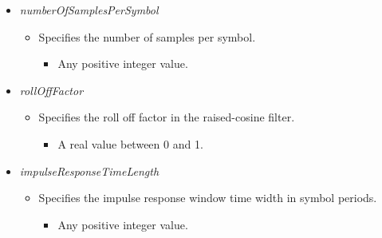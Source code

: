 \begin{refsection}
\begin{itemize}
     \item  \emph{numberOfSamplesPerSymbol}
   \begin{itemize}
     \item  Specifies the number of samples per symbol.
     \begin{itemize}
       \item Any positive integer value.
     \end{itemize}
   \end{itemize}

   \item  \emph{rollOffFactor}
   \begin{itemize}
     \item  Specifies the roll off factor in the raised-cosine filter.
     \begin{itemize}
       \item A real value between 0 and 1.
     \end{itemize}
   \end{itemize}

      \item  \emph{impulseResponseTimeLength}
   \begin{itemize}
     \item  Specifies the impulse response window time width in symbol periods.
     \begin{itemize}
       \item Any positive integer value.
     \end{itemize}
   \end{itemize}

 \end{itemize}


\clearpage
\printbibliography[heading=subbibliography]
\end{refsection}
\cleardoublepage
